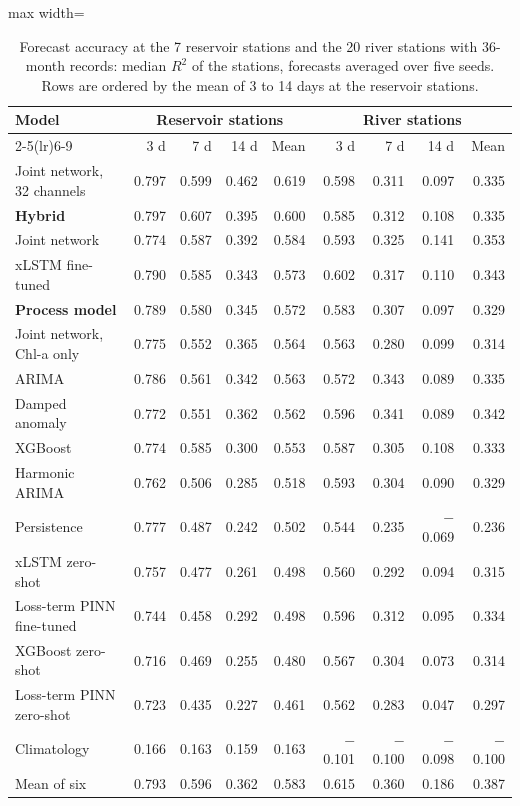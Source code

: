 \begin{table}[tbp]
\centering
\caption{Forecast accuracy at the 7 reservoir stations and the 20 river stations with 36-month records: median $R^2$ of the stations, forecasts averaged over five seeds. Rows are ordered by the mean of 3 to 14 days at the reservoir stations.}
\label{tab:S_by_type}
\footnotesize
\setlength{\tabcolsep}{4pt}
\begin{adjustbox}{max width=\textwidth}
\begin{tabular}{lrrrrrrrr}
\toprule
Model & \multicolumn{4}{c}{Reservoir stations} & \multicolumn{4}{c}{River stations} \\ \cmidrule(lr){2-5}\cmidrule(lr){6-9}
 & 3 d & 7 d & 14 d & Mean & 3 d & 7 d & 14 d & Mean \\
\midrule
Joint network, 32 channels & 0.797 & 0.599 & 0.462 & 0.619 & 0.598 & 0.311 & 0.097 & 0.335 \\
\textbf{Hybrid} & 0.797 & 0.607 & 0.395 & 0.600 & 0.585 & 0.312 & 0.108 & 0.335 \\
Joint network & 0.774 & 0.587 & 0.392 & 0.584 & 0.593 & 0.325 & 0.141 & 0.353 \\
xLSTM fine-tuned & 0.790 & 0.585 & 0.343 & 0.573 & 0.602 & 0.317 & 0.110 & 0.343 \\
\textbf{Process model} & 0.789 & 0.580 & 0.345 & 0.572 & 0.583 & 0.307 & 0.097 & 0.329 \\
Joint network, Chl-a only & 0.775 & 0.552 & 0.365 & 0.564 & 0.563 & 0.280 & 0.099 & 0.314 \\
ARIMA & 0.786 & 0.561 & 0.342 & 0.563 & 0.572 & 0.343 & 0.089 & 0.335 \\
Damped anomaly & 0.772 & 0.551 & 0.362 & 0.562 & 0.596 & 0.341 & 0.089 & 0.342 \\
XGBoost & 0.774 & 0.585 & 0.300 & 0.553 & 0.587 & 0.305 & 0.108 & 0.333 \\
Harmonic ARIMA & 0.762 & 0.506 & 0.285 & 0.518 & 0.593 & 0.304 & 0.090 & 0.329 \\
Persistence & 0.777 & 0.487 & 0.242 & 0.502 & 0.544 & 0.235 & $-$0.069 & 0.236 \\
xLSTM zero-shot & 0.757 & 0.477 & 0.261 & 0.498 & 0.560 & 0.292 & 0.094 & 0.315 \\
Loss-term PINN fine-tuned & 0.744 & 0.458 & 0.292 & 0.498 & 0.596 & 0.312 & 0.095 & 0.334 \\
XGBoost zero-shot & 0.716 & 0.469 & 0.255 & 0.480 & 0.567 & 0.304 & 0.073 & 0.314 \\
Loss-term PINN zero-shot & 0.723 & 0.435 & 0.227 & 0.461 & 0.562 & 0.283 & 0.047 & 0.297 \\
Climatology & 0.166 & 0.163 & 0.159 & 0.163 & $-$0.101 & $-$0.100 & $-$0.098 & $-$0.100 \\
\midrule
Mean of six & 0.793 & 0.596 & 0.362 & 0.583 & 0.615 & 0.360 & 0.186 & 0.387 \\
\bottomrule
\end{tabular}
\end{adjustbox}
\end{table}
